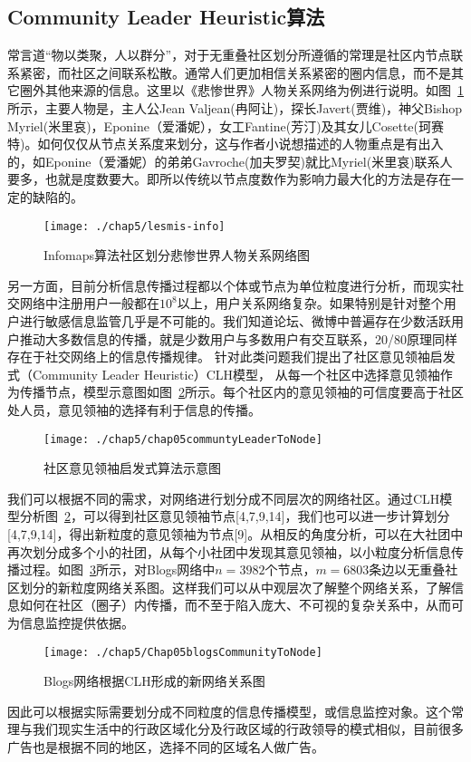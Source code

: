 \subsection{Community Leader Heuristic算法}%
常言道“物以类聚，人以群分”，对于无重叠社区划分所遵循的常理是社区内节点联系紧密，而社区之间联系松散。通常人们更加相信关系紧密的圈内信息，而不是其它圈外其他来源的信息。这里以《悲惨世界》人物关系网络为例进行说明。如图~\ref{fig:chap05lesmis}所示，主要人物是，主人公Jean Valjean(冉阿让)，探长Javert(贾维)，神父Bishop Myriel(米里哀)，Eponine（爱潘妮），女工Fantine(芳汀)及其女儿Cosette(珂赛特)。如何仅仅从节点关系度来划分，这与作者小说想描述的人物重点是有出入的，如Eponine（爱潘妮）的弟弟Gavroche(加夫罗契)就比Myriel(米里哀)联系人要多，也就是度数要大。即所以传统以节点度数作为影响力最大化的方法是存在一定的缺陷的。
\begin{figure}[H]
	\centering
	\texttt{[image: ./chap5/lesmis-info]}
	\caption{Infomaps算法\cite{rosvall2008maps}社区划分悲惨世界人物关系网络图}
	\label{fig:chap05lesmis}
\end{figure}
另一方面，目前分析信息传播过程都以个体或节点为单位粒度进行分析，而现实社交网络中注册用户一般都在$10^8$以上，用户关系网络复杂。如果特别是针对整个用户进行敏感信息监管几乎是不可能的。我们知道论坛、微博中普遍存在少数活跃用户推动大多数信息的传播，就是少数用户与多数用户有交互联系，20/80原理同样存在于社交网络上的信息传播规律。
针对此类问题我们提出了社区意见领袖启发式（Community Leader Heuristic）CLH模型，
从每一个社区中选择意见领袖\cite{katz1957two}作为传播节点，模型示意图如图~\ref{fig:chap05communtyLeaderToNode}所示。每个社区内的意见领袖的可信度要高于社区处人员，意见领袖的选择有利于信息的传播。
\begin{figure}[H]
	\centering
	\texttt{[image: ./chap5/chap05communtyLeaderToNode]}
	\caption{社区意见领袖启发式算法示意图}
	\label{fig:chap05communtyLeaderToNode}
\end{figure}
我们可以根据不同的需求，对网络进行划分成不同层次的网络社区。通过CLH模型分析图~\ref{fig:chap05communtyLeaderToNode}，可以得到社区意见领袖节点[4,7,9,14]，我们也可以进一步计算划分[4,7,9,14]，得出新粒度的意见领袖为节点[9]。从相反的角度分析，可以在大社团中再次划分成多个小的社团，从每个小社团中发现其意见领袖，以小粒度分析信息传播过程。如图~\ref{fig:Chap05blogsCommunityToNode}所示，对Blogs网络中$n=3982$个节点，$m=6803$条边以无重叠社区划分的新粒度网络关系图。这样我们可以从中观层次了解整个网络关系，了解信息如何在社区（圈子）内传播，而不至于陷入庞大、不可视的复杂关系中，从而可为信息监控提供依据。
\begin{figure}[H]
	\centering
	\texttt{[image: ./chap5/Chap05blogsCommunityToNode]}
	\caption{Blogs网络根据CLH形成的新网络关系图}
	\label{fig:Chap05blogsCommunityToNode}
\end{figure}
因此可以根据实际需要划分成不同粒度的信息传播模型，或信息监控对象。这个常理与我们现实生活中的行政区域化分及行政区域的行政领导的模式相似，目前很多广告也是根据不同的地区，选择不同的区域名人做广告。

